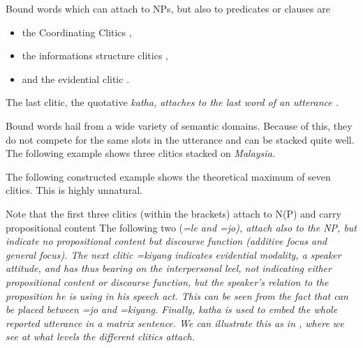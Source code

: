 Bound words which can attach to NPs, but also to predicates or clauses are
\begin{itemize}
 \item the Coordinating Clitics ,
 \item the informations structure clitics ,
 \item and the evidential clitic .
\end{itemize}


The last clitic, the quotative \em katha\em, attaches to the last word of an utterance .

Bound words hail from a wide variety of semantic domains. Because of this, they do not compete for the same slots in the utterance and can be stacked quite well. The following example shows three clitics stacked on \em Malaysia\em.


 
The following constructed example shows the theoretical maximum of seven clitics. This is highly unnatural.




Note that the first three clitics (within the brackets) attach to  N(P) and carry propositional content The following two (\em =le \em and \em =jo\em), attach also to the NP, but indicate no propositional content but discourse function (additive focus and general focus). The next clitic \em =kiyang \em indicates evidential modality, a speaker attitude, and has thus bearing on the interpersonal leel, not indicating either propositional content or discourse function, but the speaker's relation to  the proposition he is using in his speech act. This can be seen from the fact that  can be placed between \em =jo \em and \em =kiyang\em. Finally, \em katha \em is used to embed the whole reported utterance in a matrix sentence.
We can illustrate this as in , where we see at what levels the different clitics attach.

